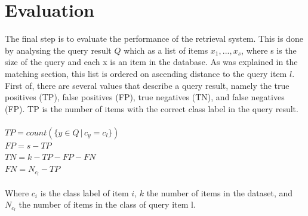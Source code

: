 \documentclass{bigdata}
\begin{document}
\section{Evaluation}
The final step is to evaluate the performance of the retrieval system. This is done by analysing the query result $Q$ which as a list of items ${x_1,...,x_s}$, where s is the size of the query and each x is an item in the database. As was explained in the matching section, this list is ordered on ascending distance to the query item $l$. First of, there are several values that describe a query result, namely the true positives (TP), false positives (FP), true negatives (TN), and false negatives (FP).
TP is the number of items with the correct class label in the query result.\\ 
\\
$TP = count(\{y \in Q\, |\, c_y = c_l\})$\\
$FP = s - TP$\\
$TN = k - TP - FP - FN$\\
$FN = N_{c_l} - TP$\\
\\
Where $c_i$ is the class label of item $i$, $k$ the number of items in the dataset, and $N_{c_l}$ the number of items in the class of query item l. 
\end{document}
